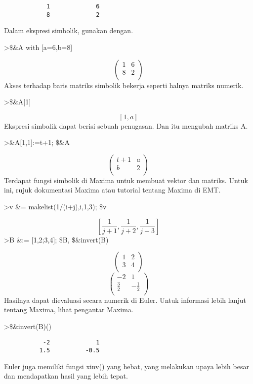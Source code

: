 \documentclass[
]{book}
\begin{document}
\begin{verbatim}
            1             6 
            8             2 
\end{verbatim}

Dalam ekspresi simbolik, gunakan dengan.

\textgreater\$\&A with {[}a=6,b=8{]}

\[\begin{pmatrix}1 & 6 \\ 8 & 2 \\ \end{pmatrix}\]Akses terhadap baris matriks simbolik bekerja seperti halnya matriks numerik.

\textgreater\$\&A{[}1{]}

\[\left[ 1 , a \right]\]Ekspresi simbolik dapat berisi sebuah penugasan. Dan itu mengubah matriks A.

\textgreater\&A{[}1,1{]}:=t+1; \$\&A

\[\begin{pmatrix}t+1 & a \\ b & 2 \\ \end{pmatrix}\]Terdapat fungsi simbolik di Maxima untuk membuat vektor dan matriks. Untuk ini, rujuk dokumentasi Maxima atau tutorial tentang Maxima di EMT.

\textgreater v \&= makelist(1/(i+j),i,1,3); \$v

\[\left[ \frac{1}{j+1} , \frac{1}{j+2} , \frac{1}{j+3} \right]\]\textgreater B \&:= {[}1,2;3,4{]}; \$B, \$\&invert(B)

\[\begin{pmatrix}1 & 2 \\ 3 & 4 \\ \end{pmatrix}\] \[\begin{pmatrix}-2 & 1 \\ \frac{3}{2} & -\frac{1}{2} \\ \end{pmatrix}\]Hasilnya dapat dievaluasi secara numerik di Euler. Untuk informasi lebih lanjut tentang Maxima, lihat pengantar Maxima.

\textgreater\$\&invert(B)()

\begin{verbatim}
           -2             1 
          1.5          -0.5 
\end{verbatim}

Euler juga memiliki fungsi xinv() yang hebat, yang melakukan upaya lebih besar dan mendapatkan hasil yang lebih tepat.
\end{document}
